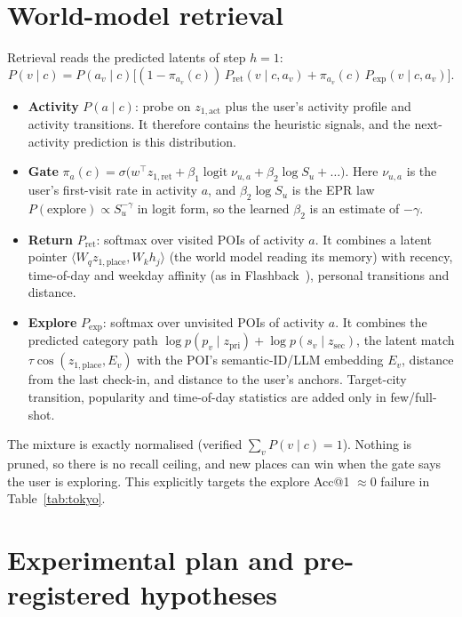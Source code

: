 \documentclass[10.5pt]{article}
\begin{document}
\section{World-model retrieval}\label{sec:retrieval}
Retrieval reads the predicted latents of step $h{=}1$:
\begin{equation}
P(v\mid c)=P(a_v\mid c)\Big[(1-\pi_{a_v}(c))\,P_{\mathrm{ret}}(v\mid c,a_v)+\pi_{a_v}(c)\,P_{\mathrm{exp}}(v\mid c,a_v)\Big].
\end{equation}
\begin{itemize}
\item \textbf{Activity} $P(a\mid c)$: probe on $z_{1,\mathrm{act}}$ plus the user's activity profile and activity
transitions. It therefore contains the heuristic signals, and the next-activity prediction is this distribution.
\item \textbf{Gate} $\pi_a(c)=\sigma\big(w^\top z_{1,\mathrm{ret}}+\beta_1\operatorname{logit}\nu_{u,a}+\beta_2\log
S_u+\dots\big)$. Here $\nu_{u,a}$ is the user's first-visit rate in activity $a$, and $\beta_2\log S_u$ is the EPR
law~\cite{epr} $P(\text{explore})\propto S_u^{-\gamma}$ in logit form, so the learned $\beta_2$ is an estimate of
$-\gamma$.
\item \textbf{Return} $P_{\mathrm{ret}}$: softmax over visited POIs of activity $a$. It combines a latent pointer
$\langle W_q z_{1,\mathrm{place}},W_k h_j\rangle$ (the world model reading its memory) with recency, time-of-day and
weekday affinity (as in Flashback~\cite{flashback}), personal transitions and distance.
\item \textbf{Explore} $P_{\mathrm{exp}}$: softmax over unvisited POIs of activity $a$. It combines the predicted
category path $\log p(p_v\mid z_{\mathrm{pri}})+\log p(s_v\mid z_{\mathrm{sec}})$, the latent match
$\tau\cos(z_{1,\mathrm{place}},E_v)$ with the POI's semantic-ID/LLM embedding $E_v$, distance from the last check-in,
and distance to the user's anchors. Target-city transition, popularity and time-of-day statistics are added only in
few/full-shot.
\end{itemize}
The mixture is exactly normalised (verified $\sum_v P(v\mid c)=1$). Nothing is pruned, so there is no recall ceiling,
and new places can win when the gate says the user is exploring. This explicitly targets the explore Acc@1
$\approx 0$ failure in Table~\ref{tab:tokyo}.

\section{Experimental plan and pre-registered hypotheses}\label{sec:plan}
\end{document}
